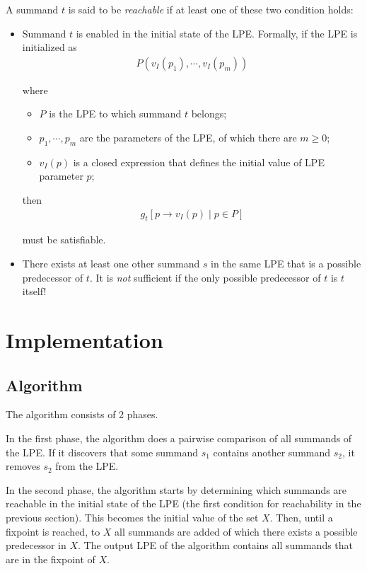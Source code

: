 A summand $t$ is said to be \emph{reachable} if at least one of these two condition holds:

\begin{itemize}
\item Summand $t$ is enabled in the initial state of the LPE.
Formally, if the LPE is initialized as
\begin{align*}
P(v_I(p_1), \cdots{}, v_I(p_m))
\end{align*}

where

\begin{itemize}
\item $P$ is the LPE to which summand $t$ belongs;
\item $p_1, \cdots{}, p_m$ are the parameters of the LPE, of which there are $m \geq 0$;
\item $v_I(p)$ is a closed expression that defines the initial value of LPE parameter $p$;
\end{itemize}

then
\begin{align*}
g_t[p \rightarrow v_I(p) \;|\; p \in P]
\end{align*}

must be satisfiable.

\item There exists at least one other summand $s$ in the same LPE that is a possible predecessor of $t$.
It is \emph{not} sufficient if the only possible predecessor of $t$ is $t$ itself!
\end{itemize}

\section{Implementation}

\subsection{Algorithm}

The algorithm consists of 2 phases.

In the first phase, the algorithm does a pairwise comparison of all summands of the LPE.
If it discovers that some summand $s_1$ contains another summand $s_2$, it removes $s_2$ from the LPE.

In the second phase, the algorithm starts by determining which summands are reachable in the initial state of the LPE (the first condition for reachability in the previous section).
This becomes the initial value of the set $X$.
Then, until a fixpoint is reached, to $X$ all summands are added of which there exists a possible predecessor in $X$.
The output LPE of the algorithm contains all summands that are in the fixpoint of $X$.

